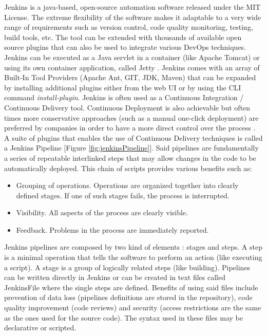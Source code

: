Jenkins \cite{JenkinsGuide} is a java-based, open-source automation software released under the MIT License. The extreme flexibility of the software makes it adaptable to a very wide range of requirements such as version control, code quality monitoring, testing, build tools, etc.
The tool can be extended with thousands of available open source plugins that can also be used to integrate various DevOps techniques. Jenkins can be executed as a Java servlet in a container (like Apache Tomcat) or using its own container application, called Jetty \cite[p.~51]{JenkinsGuide}. Jenkins comes with an array of Built-In Tool Providers (Apache Ant, GIT, JDK, Maven) that can be expanded by installing additional plugins either from the web UI or by using the CLI command \textit{install-plugin}. Jenkins is often used as a Continuous Integration / Continuous Delivery tool. Continuous Deployment is also achievable but often times more conservative approaches (such as a manual one-click deployment) are preferred by companies in order to have a more direct control over the process \cite[p.~325]{JenkinsGuide}. A suite of plugins that enables the use of Continuous Delivery techniques is called a Jenkins Pipeline [Figure \ref{fig:jenkinsPipeline}]. Said pipelines are fundamentally a series of repeatable interlinked steps that may allow changes in the code to be automatically deployed. This chain of scripts provides various benefits \cite[p.~165]{JenkinsCD} such as:

\begin{itemize}
  \item Grouping of operations. Operations are organized together into clearly defined stages. If one of such stages fails, the process is interrupted.
  \item Visibility. All aspects of the process are clearly visible.
  \item Feedback. Problems in the process are immediately reported.
\end{itemize}

Jenkins pipelines are composed by two kind of elements \cite[p.~166]{JenkinsCD}: stages and steps. A step is a minimal operation that tells the software to perform an action (like executing a script). A stage is a group of logically related steps (like building). Pipelines can be written directly in Jenkins or can be created in text files called JenkinsFile \cite[p.~186]{JenkinsCD} where the single steps are defined.
Benefits of using said files include prevention of data loss (pipelines definitions are stored in the repository), code quality improvement (code reviews) and security (access restrictions are the same as the ones used for the source code). The syntax used in these files may be declarative or scripted.

